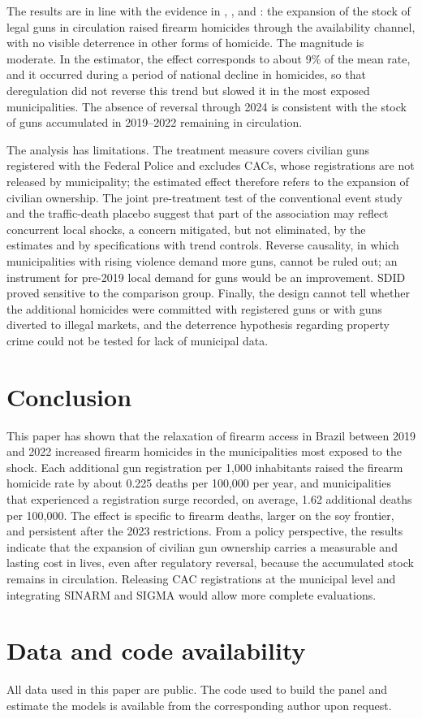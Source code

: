 \documentclass[11pt,a4paper]{article}
\begin{document}
The results are in line with the evidence in \citet{duggan2001}, \citet{cook2006}, and \citet{cerqueira2012}: the expansion of the stock of legal guns in circulation raised firearm homicides through the availability channel, with no visible deterrence in other forms of homicide. The magnitude is moderate. In the \citet{callaway2021} estimator, the effect corresponds to about 9\% of the mean rate, and it occurred during a period of national decline in homicides, so that deregulation did not reverse this trend but slowed it in the most exposed municipalities. The absence of reversal through 2024 is consistent with the stock of guns accumulated in 2019--2022 remaining in circulation.

The analysis has limitations. The treatment measure covers civilian guns registered with the Federal Police and excludes CACs, whose registrations are not released by municipality; the estimated effect therefore refers to the expansion of civilian ownership. The joint pre-treatment test of the conventional event study and the traffic-death placebo suggest that part of the association may reflect concurrent local shocks, a concern mitigated, but not eliminated, by the \citet{callaway2021} estimates and by specifications with trend controls. Reverse causality, in which municipalities with rising violence demand more guns, cannot be ruled out; an instrument for pre-2019 local demand for guns would be an improvement. SDID proved sensitive to the comparison group. Finally, the design cannot tell whether the additional homicides were committed with registered guns or with guns diverted to illegal markets, and the deterrence hypothesis regarding property crime could not be tested for lack of municipal data.

\section{Conclusion}\label{sec:conclusao}

This paper has shown that the relaxation of firearm access in Brazil between 2019 and 2022 increased firearm homicides in the municipalities most exposed to the shock. Each additional gun registration per 1,000 inhabitants raised the firearm homicide rate by about 0.225 deaths per 100,000 per year, and municipalities that experienced a registration surge recorded, on average, 1.62 additional deaths per 100,000. The effect is specific to firearm deaths, larger on the soy frontier, and persistent after the 2023 restrictions. From a policy perspective, the results indicate that the expansion of civilian gun ownership carries a measurable and lasting cost in lives, even after regulatory reversal, because the accumulated stock remains in circulation. Releasing CAC registrations at the municipal level and integrating SINARM and SIGMA would allow more complete evaluations.

\section*{Data and code availability}
All data used in this paper are public. The code used to build the panel and estimate the models is available from the corresponding author upon request.



\end{document}
